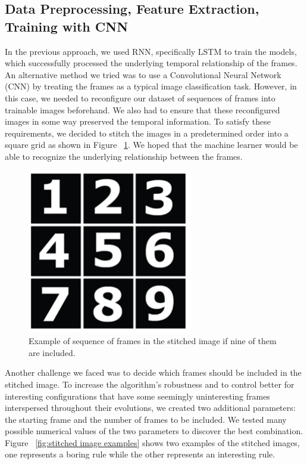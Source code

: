 \documentclass[12pt]{article}
\numberwithin{figure}{section} %
\begin{document}
\subsection{Data Preprocessing, Feature Extraction, Training with CNN}
In the previous approach, we used RNN, specifically LSTM to train the models, which successfully processed the underlying temporal relationship of the frames. An alternative method we tried was to use a Convolutional Neural Network (CNN) by treating the frames as a typical image classification task. However, in this case, we needed to reconfigure our dataset of sequences of frames into trainable images beforehand. We also had to ensure that these reconfigured images in some way preserved the temporal information. To satisfy these requirements, we decided to stitch the images in a predetermined order into a square grid as shown in Figure ~\ref{fig:stitched square grid}. We hoped that the machine learner would be able to recognize the underlying relationship between the frames. 

\begin{figure}[H]
	\centering
	\includegraphics[width=0.3\linewidth]{Section3/2}
	\caption[Stitched square grid]{Example of sequence of frames in the stitched image if nine of them are included.}
	\vspace{-1.5em}
	\label{fig:stitched square grid}
\end{figure}
Another challenge we faced was to decide which frames should be included in the stitched image. To increase the algorithm’s robustness and to control better for interesting configurations that have some seemingly uninteresting frames interspersed throughout their evolutions, we created two additional parameters: the starting frame and the number of frames to be included. We tested many possible numerical values of the two parameters to discover the best combination. Figure ~\ref{fig:stitched image examples} shows two examples of the stitched images, one represents a boring rule while the other represents an interesting rule. 
\end{document}
